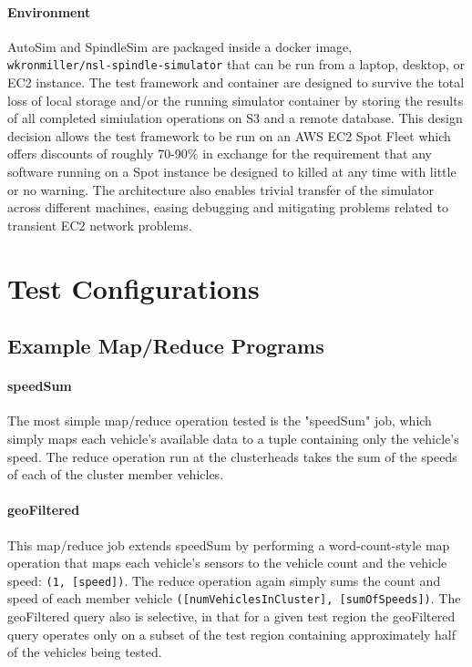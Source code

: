 \documentclass{thesis}
\begin{document}
    \paragraph{Environment}
        AutoSim and SpindleSim are packaged inside a docker image, \\\verb|wkronmiller/nsl-spindle-simulator| that can be run from
        a laptop, desktop, or EC2 instance. The test framework and container are designed to survive the total loss of local
        storage and/or the running simulator container by storing the results of all completed simiulation operations on
        S3 and a remote database. This design decision allows the test framework to be run on an AWS EC2 Spot Fleet %
        which offers discounts of roughly 70-90\% in exchange for the requirement that any software running on a Spot instance
        be designed to killed at any time with little or no warning. %
        The architecture also enables trivial transfer of the simulator across different machines, easing debugging and mitigating
        problems related to transient EC2 network problems. 
\section{Test Configurations}
\subsection{Example Map/Reduce Programs}
    \paragraph{speedSum}
        The most simple map/reduce operation tested is the "speedSum" job, which simply maps each vehicle's available data to a
        tuple containing only the vehicle's speed. The reduce operation run at the clusterheads takes the sum of the speeds
        of each of the cluster member vehicles.
    \paragraph{geoFiltered}
        This map/reduce job extends speedSum by performing a word-count-style map operation that maps each vehicle's sensors
        to the vehicle count and the vehicle speed: \verb|(1, [speed])|. The reduce operation again simply sums the count
        and speed of each member vehicle \verb|([numVehiclesInCluster], [sumOfSpeeds])|. The geoFiltered query also is selective,
        in that for a given test region the geoFiltered query operates only on a subset of the test region containing approximately
        half of the vehicles being tested.
\end{document}
